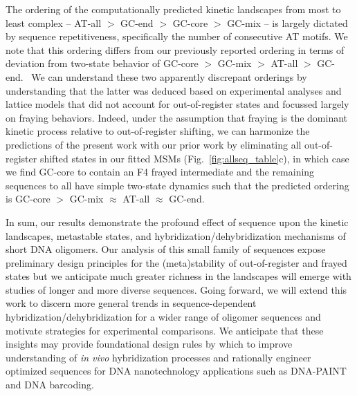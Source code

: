 \documentclass[journal=jpcbfk,manuscript=article]{achemso}
\begin{document}
The ordering of the computationally predicted kinetic landscapes from most to least complex -- AT-all $>$ GC-end $>$ GC-core $>$ GC-mix -- is largely dictated by sequence repetitiveness, specifically the number of consecutive AT motifs. We note that this ordering differs from our previously reported ordering in terms of deviation from two-state behavior of GC-core $>$ GC-mix $>$ AT-all $>$ GC-end.~\citep{Sanstead2016, Sanstead2018DirectDehybridization} We can understand these two apparently discrepant orderings by understanding that the latter was deduced based on experimental analyses and lattice models that did not account for out-of-register states and focussed largely on fraying behaviors. Indeed, under the assumption that fraying is the dominant kinetic process relative to out-of-register shifting, we  can harmonize the predictions of the present work with our prior work by eliminating all out-of-register shifted states in our fitted MSMs (Fig.~\ref{fig:allseq_table}c), in which case we find GC-core to contain an F4 frayed intermediate and the remaining sequences to all have simple two-state dynamics such that the predicted ordering is GC-core $>$ GC-mix $\approx$ AT-all $\approx$ GC-end.

In sum, our results demonstrate the profound effect of sequence upon the kinetic landscapes, metastable states, and hybridization/dehybridization mechanisms of short DNA oligomers. Our analysis of this small family of sequences expose preliminary design principles for the (meta)stability of out-of-register and frayed states but we anticipate much greater richness in the landscapes will emerge with studies of longer and more diverse sequences. Going forward, we will extend this work to discern more general trends in sequence-dependent hybridization/dehybridization for a wider range of oligomer sequences and motivate strategies for experimental comparisons. We anticipate that these insights may provide foundational design rules by which to improve understanding of \emph{in vivo} hybridization processes and rationally engineer optimized sequences for DNA nanotechnology applications such as DNA-PAINT~\citep{Strauss2020UpDNA-PAINT} and DNA barcoding.~\citep{Shah2019} 
\end{document}
